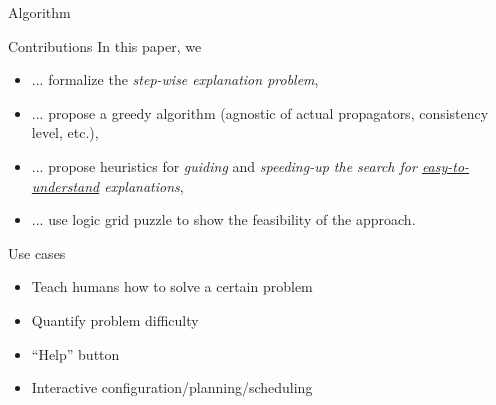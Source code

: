\documentclass{beamer}
\begin{document}
\begin{frame}{Algorithm}
{\begin{minipage}[t]{0.40\textwidth}
\begin{figure}[h]
                \label{clues}
            \end{figure}

        \end{minipage}

    }



\end{frame}






\begin{frame}{Contributions}
    \vfill
    In this paper, we
    \vfill
    \begin{itemize}
        \item ... formalize the \emph{step-wise explanation problem},
        \item ... propose a greedy algorithm (agnostic of actual propagators, consistency level, etc.),
        \item ... propose heuristics for \emph{guiding} and \emph{speeding-up the search for \underline{easy-to-understand} explanations},
        \item ... use logic grid puzzle to show the feasibility of the approach.
    \end{itemize}
    \vfill
\end{frame}

\begin{frame}{Use cases}
    \begin{itemize}
        \item Teach humans how to solve a certain problem
        \item Quantify problem difficulty
        \item ``Help'' button
        \item Interactive configuration/planning/scheduling
    \end{itemize}
\end{frame}
\end{document}
